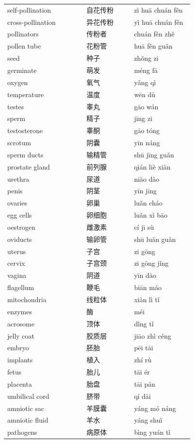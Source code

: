 \documentclass[11pt]{article}
\begin{document}
\begin{longtable}{@{}p{0.40\linewidth}p{0.24\linewidth}p{0.30\linewidth}@{}}
self-pollination & 自花传粉 & zì huā chuán fěn \\
cross-pollination & 异花传粉 & yì huā chuán fěn \\
pollinators & 传粉者 & chuán fěn zhě \\
pollen tube & 花粉管 & huā fěn guǎn \\
seed & 种子 & zhǒng zi \\
germinate & 萌发 & méng fā \\
oxygen & 氧气 & yǎng qì \\
temperature & 温度 & wēn dù \\
testes & 睾丸 & gāo wán \\
sperm & 精子 & jīng zi \\
testosterone & 睾酮 & gāo tóng \\
scrotum & 阴囊 & yīn náng \\
sperm ducts & 输精管 & shū jīng guǎn \\
prostate gland & 前列腺 & qián liè xiàn \\
urethra & 尿道 & niào dào \\
penis & 阴茎 & yīn jīng \\
ovaries & 卵巢 & luǎn cháo \\
egg cells & 卵细胞 & luǎn xì bāo \\
oestrogen & 雌激素 & cí jī sù \\
oviducts & 输卵管 & shū luǎn guǎn \\
uterus & 子宫 & zi gōng \\
cervix & 子宫颈 & zi gōng jǐng \\
vagina & 阴道 & yīn dào \\
flagellum & 鞭毛 & biān máo \\
mitochondria & 线粒体 & xiàn lì tǐ \\
enzymes & 酶 & méi \\
acrosome & 顶体 & dǐng tǐ \\
jelly coat & 胶质层 & jiāo zhì céng \\
embryo & 胚胎 & pēi tāi \\
implants & 植入 & zhí rù \\
fetus & 胎儿 & tāi ér \\
placenta & 胎盘 & tāi pán \\
umbilical cord & 脐带 & qí dài \\
amniotic sac & 羊膜囊 & yáng mó náng \\
amniotic fluid & 羊水 & yáng shuǐ \\
pathogens & 病原体 & bìng yuán tǐ \\

\end{longtable}
\end{document}
